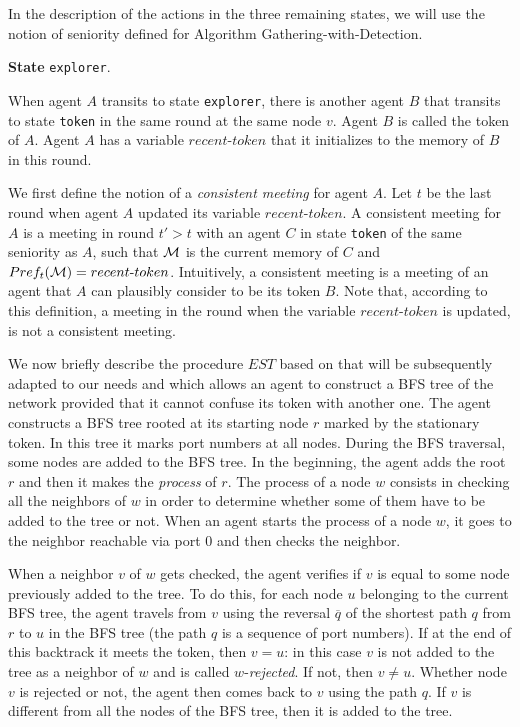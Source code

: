 \documentclass[11pt]{article}
\newcommand{\cM}{{\cal M}}
\begin{document}
In the description of the actions in the three remaining states, we will use the notion of seniority defined for  Algorithm Gathering-with-Detection.

 
 
    \vspace*{0.2cm}
 
  \noindent
    {\bf State} {\tt explorer}.
    
    When agent $A$ transits to state {\tt explorer}, there is another agent $B$ that transits to state  {\tt token} in the same round at the same node $v$.
 Agent $B$ is called the token of $A$. Agent $A$ has a variable $recent$-$token$ that it initializes to the memory of $B$ in this round. 
 
 We first define the notion of a {\em consistent meeting} for agent $A$.
 Let $t$ be the last round when agent $A$ updated its variable $recent$-$token$. 
 A consistent meeting for $A$ is a meeting in round $t'>t$ with an agent $C$ in state  {\tt token}
 of the same seniority as $A$,  such that $\cM$ is the current memory of $C$ and  $Pref_t(\cM)=recent\mbox{-}token$. Intuitively, a consistent meeting is a meeting of
 an agent that $A$ can plausibly consider to be its token $B$. Note that, according to this definition, a meeting in the round when the variable $recent$-$token$ is updated,
 is not a consistent meeting.
 
 We now briefly describe the procedure $EST$ based on \cite{CDK} that will be subsequently adapted to our needs {and which allows an agent to construct a BFS tree of the network provided that it cannot confuse its token with another one.}
The agent constructs a BFS tree rooted at its starting node $r$
marked by the stationary token. In this tree it marks port numbers at all nodes. 
During the BFS traversal, some nodes are added to the BFS tree. {In the beginning, the agent adds the root $r$ and then it makes the {\em process} of $r$. The process of a node $w$ consists in checking all the neighbors of $w$ in order to determine whether 
some of them have to be added to the tree or not. When an agent starts the process of a node $w$, it goes to the neighbor reachable via port $0$ and then checks the neighbor.}

{When a neighbor $v$ of $w$ gets checked, the agent  
verifies if $v$ is equal to some node
previously added to the tree. To do this, for each node $u$ belonging to the current BFS tree, the agent travels from $v$ using the reversal $\overline{q}$ of the shortest path $q$ from $r$ to $u$ in the BFS tree (the path $q$ is
a sequence of port numbers). If at the end of this backtrack it meets the token, then $v=u$: in this case $v$ is not added to the tree as a neighbor of $w$ and is called $w$-{\em rejected}. If not, then $v\neq u$. Whether node $v$ is rejected or not, the agent then comes back to $v$ using the path $q$. If $v$ is different from all the nodes of the BFS tree, then it is added to the tree.}
\end{document}

